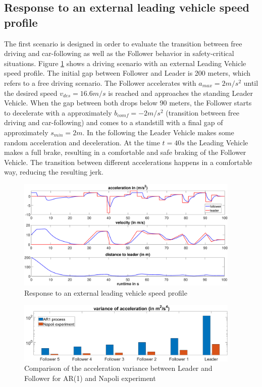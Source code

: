 \documentclass[review]{elsarticle}
\begin{document}
\subsection{Response to an external leading vehicle speed profile}
The first scenario is designed in order to evaluate the transition between free driving and car-following as well as the Follower behavior in safety-critical situations. 
Figure \ref{fig:manipulatedLeader} shows a driving scenario with an external Leading Vehicle speed profile. The initial gap between Follower and Leader is 200 meters, which refers to a free driving scenario. The Follower accelerates with $a_{max} = 2m/s^2$ until the desired speed $v_{des} = 16.6m/s$ is reached and approaches the standing Leader Vehicle. When the gap between both drops below 90 meters, the Follower starts to decelerate with a approximately $b_{comf} = -2m/s^2$ (transition between free driving and car-following) and comes to a standstill with a final gap of approximately $s_{min} = 2m$. In the following the Leader Vehicle makes some random acceleration and deceleration. At the time $t = 40s$ the Leading Vehicle makes a full brake, resulting in a comfortable and safe braking of the Follower Vehicle. The transition between different accelerations happens in a comfortable way, reducing the resulting jerk. 



\begin{figure}
	\centering
	\includegraphics[width=0.95\textwidth]{images/manipulatedLeader.eps}
	\caption{Response to an external leading vehicle speed profile}
	\label{fig:manipulatedLeader}
\end{figure}

\begin{figure}
	\centering
	\includegraphics[width=0.95\textwidth]{images/VarAccComp}
	\caption{Comparison of the acceleration variance between Leader and Follower for AR(1) and Napoli experiment}
	\label{fig:VarAccComp}
\end{figure}
\end{document}
